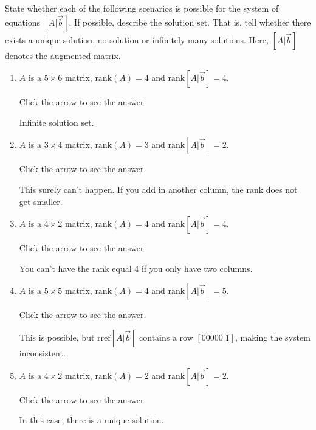 \documentclass{ximera}
\begin{document}
\begin{problem}\label{prb:2.56} State whether each of the following scenarios is possible for the
system of equations $\left[A |\vec{b}\right]$. If possible, describe the solution set.
That is, tell whether there exists a unique solution, no solution or
infinitely many solutions. Here, $\left[ A |\vec{b} \right]$ denotes the augmented matrix.

\begin{enumerate}
\item $A$ is a $5\times 6$ matrix, $\mbox{rank}\left( A\right) =4$ and
$\mbox{rank}\left[ A |\vec{b} \right] =4.$

Click the arrow to see the answer. 
\begin{expandable}
Infinite solution set.
\end{expandable}

\item $A$ is a $3\times 4$ matrix, $\mbox{rank}\left( A\right) =3$ and
$\mbox{rank}\left[ A |\vec{b} \right] =2.$

Click the arrow to see the answer. 
\begin{expandable}
This surely can't happen. If you add in another column, the rank does not get smaller.
\end{expandable}

\item $A$ is a $4\times 2$ matrix, $\mbox{rank}\left( A\right) =4$ and
$\mbox{rank}\left[ A |\vec{b} \right] =4.$

Click the arrow to see the answer. 
\begin{expandable}
You can't have the rank equal 4 if you only have two columns.
\end{expandable}

\item $A$ is a $5\times 5$ matrix, $\mbox{rank}\left( A\right) =4$ and
$\mbox{rank}\left[ A |\vec{b} \right] =5.$

Click the arrow to see the answer. 
\begin{expandable}
This is possible, but $\mbox{rref} \left[A | \vec{b}\right]$ contains a row $[0 0 0 0 0 | 1]$, making the system inconsistent.
\end{expandable}

\item $A$ is a $4\times 2$ matrix, $\mbox{rank}\left( A\right) =2$ and
$\mbox{rank}\left[ A |\vec{b} \right] =2$.

Click the arrow to see the answer. 
\begin{expandable}
In this case, there is a
unique solution.
\end{expandable}
\end{enumerate}
\end{problem}
\end{document}
